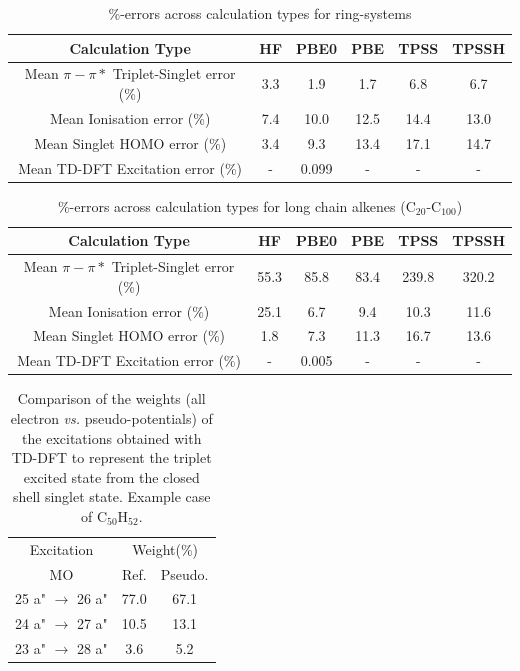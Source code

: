 \documentclass[12pt]{article}
\begin{document}
\begin{table}[h]
\begin{tabular}{c c c c c c }
\hline
Calculation Type & HF & PBE0 & PBE & TPSS & TPSSH \\
\hline
Mean \(\pi - \pi*\) Triplet-Singlet error (\%) & 3.3 & 1.9 & 1.7 & 6.8 & 6.7 \\
Mean Ionisation error (\%) & 7.4 & 10.0 & 12.5 & 14.4 & 13.0 \\
Mean Singlet HOMO error (\%) & 3.4  & 9.3  & 13.4 & 17.1 & 14.7 \\
Mean TD-DFT Excitation error (\%) & - & 0.099 & - & - & - \\ 
\hline
\end{tabular}
\caption{\%-errors across calculation types for ring-systems}
\label{table:ring_system_errors}
\end{table}

\newpage

\begin{table}[h]
\begin{tabular}{c c c c c c }
\hline
Calculation Type & HF & PBE0 & PBE & TPSS & TPSSH \\
\hline
Mean \(\pi - \pi*\) Triplet-Singlet error (\%) & 55.3 & 85.8 & 83.4 & 239.8 & 320.2 \\
Mean Ionisation error (\%) & 25.1 & 6.7 & 9.4 & 10.3 & 11.6 \\
Mean Singlet HOMO error (\%) & 1.8 & 7.3 & 11.3 & 16.7 & 13.6 \\
Mean TD-DFT Excitation error (\%) & - & 0.005 & - & - & - \\ 
\hline
\end{tabular}
\caption{\%-errors across calculation types for long chain alkenes (C\(_{20}\)-C\(_{100}\))}
\label{table:long_alkene_errors}
\end{table}

\newpage

\begin{table}
\begin{tabular}{c c c c}
\hline
\multicolumn{2}{c}{Excitation} & \multicolumn{2}{c}{Weight(\%)}\\
\multicolumn{2}{c}{MO} & Ref. & Pseudo.\\
\hline
\multicolumn{2}{c}{25 a" \(\rightarrow\) 26 a"} & 77.0 &   67.1  \\
\multicolumn{2}{c}{24 a" \(\rightarrow\) 27 a"} & 10.5 &   13.1  \\
\multicolumn{2}{c}{23 a" \(\rightarrow\) 28 a"} & 3.6  &    5.2  \\
\hline
\end{tabular}
\caption{\label{tab:coef}Comparison of the weights (all electron \emph{vs.} pseudo-potentials)
of the excitations obtained with TD-DFT
to represent the triplet excited state from the closed shell singlet state.
Example case of C$_{50}$H$_{52}$.}
\end{table}
\end{document}
